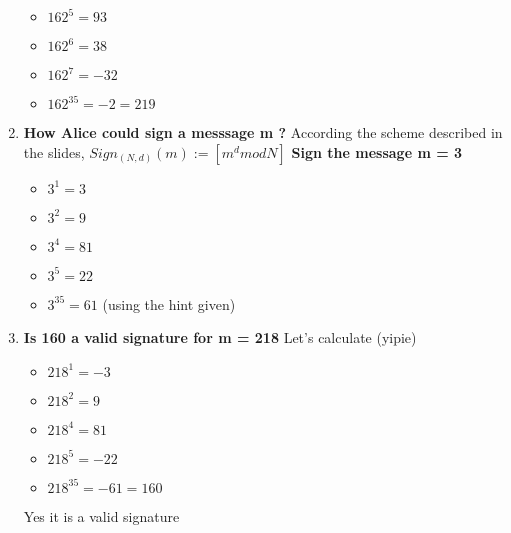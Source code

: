 \begin{solution}
\begin{enumerate}
\begin{itemize}
          \item $162^{5} = 93 $
          \item $162^{6} = 38 $
          \item $162^{7} = -32 $
          \item $162^{35} = -2 = 219 $
      \end{itemize}
      \item \textbf{How Alice could sign a messsage m ?} According the scheme described in the slides, $Sign_{(N, d)}(m) := [m^d mod N]$ \newline \newline
      \textbf{Sign the message m = 3} 
      \begin{itemize}
          \item $3^{1} = 3 $
          \item $3^{2} = 9 $
          \item $3^{4} = 81 $
          \item $3^{5} = 22 $
          \item $3^{35} = 61 $ (using the hint given)
      \end{itemize}
      \item \textbf{Is 160 a valid signature for m = 218}
      Let's calculate (yipie) 
      \begin{itemize}
          \item $218^{1} = -3 $
          \item $218^{2} = 9 $
          \item $218^{4} = 81 $
          \item $218^{5} = -22 $
          \item $218^{35} = -61 = 160$
      \end{itemize}
      Yes it is a valid signature
  \end{enumerate}
\end{solution}